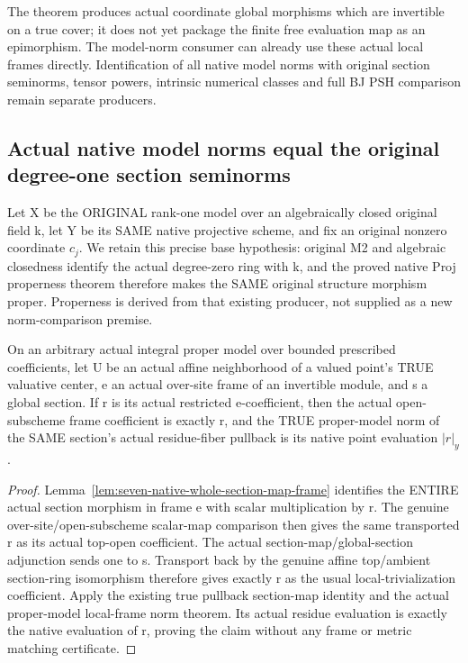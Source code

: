 \begin{remark}
The theorem produces actual coordinate global morphisms which are invertible
on a true cover; it does not yet package the finite free evaluation map as
an epimorphism. The model-norm consumer can already use these actual local
frames directly. Identification of all native model norms with original
section seminorms, tensor powers, intrinsic numerical classes and full BJ
PSH comparison remain separate producers.
\end{remark}

\subsection{Actual native model norms equal the original degree-one section seminorms}
Let X be the ORIGINAL rank-one model over an algebraically closed original
field k, let Y be its SAME native projective scheme, and fix an original
nonzero coordinate $c_j$. We retain this precise base hypothesis: original M2
and algebraic closedness identify the actual degree-zero ring with k, and
the proved native Proj properness theorem therefore makes the SAME original
structure morphism proper. Properness is derived from that existing producer,
not supplied as a new norm-comparison premise.

\begin{lemma}
\label{lem:seven-native-over-frame-model-norm}
\leanok
On an arbitrary actual integral proper model over bounded prescribed
coefficients, let U be an actual affine neighborhood of a valued point's
TRUE valuative center, e an actual over-site frame of an invertible module,
and s a global section. If r is its actual restricted e-coefficient, then
the actual open-subscheme frame coefficient is exactly r, and the TRUE
proper-model norm of the SAME section's actual residue-fiber pullback is
its native point evaluation $|r|_y$.
\end{lemma}
\begin{proof}
Lemma~\ref{lem:seven-native-whole-section-map-frame} identifies the ENTIRE
actual section morphism in frame e with scalar multiplication by r.
The genuine over-site/open-subscheme scalar-map comparison then gives the
same transported r as its actual top-open coefficient. The actual
section-map/global-section adjunction sends one to s. Transport back by
the genuine affine top/ambient section-ring isomorphism therefore gives
exactly r as the usual local-trivialization coefficient. Apply the
existing true pullback section-map identity and the actual proper-model
local-frame norm theorem. Its actual residue evaluation is exactly the
native evaluation of r, proving the claim without any frame or metric
matching certificate.
\end{proof}

